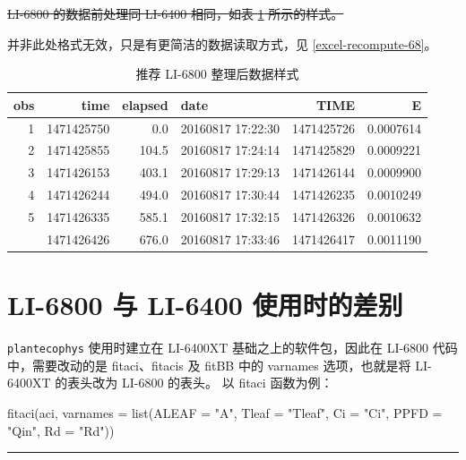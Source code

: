 \documentclass[
]{krantz}
\makeatletter
\newenvironment{Shaded}{\begin{snugshade}}{\end{snugshade}}
\newcommand{\AttributeTok}[1]{\textcolor[rgb]{0.77,0.63,0.00}{#1}}
\newcommand{\FunctionTok}[1]{\textcolor[rgb]{0.00,0.00,0.00}{#1}}
\newcommand{\NormalTok}[1]{#1}
\newcommand{\StringTok}[1]{\textcolor[rgb]{0.31,0.60,0.02}{#1}}
\newenvironment{kframe}{%
\medskip{}
\setlength{\fboxsep}{.8em}
 \def\at@end@of@kframe{}%
 \ifinner\ifhmode%
  \def\at@end@of@kframe{\end{minipage}}%
  \begin{minipage}{\columnwidth}%
 \fi\fi%
 \def\FrameCommand##1{\hskip\@totalleftmargin \hskip-\fboxsep
 \colorbox{shadecolor}{##1}\hskip-\fboxsep
     \hskip-\linewidth \hskip-\@totalleftmargin \hskip\columnwidth}%
 \MakeFramed {\advance\hsize-\width
   \@totalleftmargin\z@ \linewidth\hsize
   \@setminipage}}%
 {\par\unskip\endMakeFramed%
 \at@end@of@kframe}
\renewenvironment{Shaded}{\begin{kframe}}{\end{kframe}}
\makeatother
\begin{document}
\sout{LI-6800 的数据前处理同 LI-6400 相同，如表 \ref{tab:head6800} 所示的样式。}

并非此处格式无效，只是有更简洁的数据读取方式，见 \ref{excel-recompute-68}。

\begin{longtable}[t]{rrrlrr}
\caption{\label{tab:head6800}推荐 LI-6800 整理后数据样式}\\
\toprule
obs & time & elapsed & date & TIME & E\\
\midrule
1 & 1471425750 & 0.0 & 20160817 17:22:30 & 1471425726 & 0.0007614\\
2 & 1471425855 & 104.5 & 20160817 17:24:14 & 1471425829 & 0.0009221\\
3 & 1471426153 & 403.1 & 20160817 17:29:13 & 1471426144 & 0.0009900\\
4 & 1471426244 & 494.0 & 20160817 17:30:44 & 1471426235 & 0.0010249\\
5 & 1471426335 & 585.1 & 20160817 17:32:15 & 1471426326 & 0.0010632\\
\addlinespace
6 & 1471426426 & 676.0 & 20160817 17:33:46 & 1471426417 & 0.0011190\\
\bottomrule
\end{longtable}

\hypertarget{dif}{%
\section{LI-6800 与 LI-6400 使用时的差别}\label{dif}}

\texttt{plantecophys} 使用时建立在 LI-6400XT 基础之上的软件包，因此在 LI-6800 代码中，需要改动的是 fitaci、fitacis 及 fitBB 中的 varnames 选项，也就是将 LI-6400XT 的表头改为 LI-6800 的表头。
以 fitaci 函数为例：

\begin{Shaded}
\begin{Highlighting}[]
 \FunctionTok{fitaci}\NormalTok{(aci, }\AttributeTok{varnames =} 
        \FunctionTok{list}\NormalTok{(}\AttributeTok{ALEAF =} \StringTok{"A"}\NormalTok{, }\AttributeTok{Tleaf =} \StringTok{"Tleaf"}\NormalTok{, }\AttributeTok{Ci =} \StringTok{"Ci"}\NormalTok{, }
          \AttributeTok{PPFD  =} \StringTok{"Qin"}\NormalTok{, }\AttributeTok{Rd =} \StringTok{"Rd"}\NormalTok{))}
\end{Highlighting}
\end{Shaded}

\begin{center}\rule{0.5\linewidth}{0.5pt}\end{center}
\end{document}
